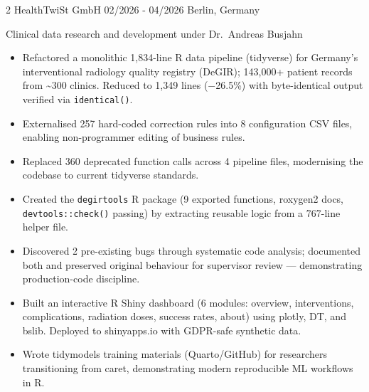 \documentclass{thejus_cv}
\begin{document}
\begin{paracol}{2}
             {HealthTwiSt GmbH}
             {02/2026 - 04/2026}
             {Berlin, Germany}
             {Clinical data research and development under Dr.~Andreas Busjahn
             \begin{itemize}\setlength{\itemsep}{0.05em}
                   \item Refactored a monolithic 1,834-line R data pipeline (tidyverse) for Germany's interventional radiology quality registry (DeGIR); 143,000+ patient records from \textasciitilde300 clinics. Reduced to 1,349 lines ($-$26.5\%) with byte-identical output verified via \texttt{identical()}.
                   \item Externalised 257 hard-coded correction rules into 8 configuration CSV files, enabling non-programmer editing of business rules.
                   \item Replaced 360 deprecated function calls across 4 pipeline files, modernising the codebase to current tidyverse standards.
                   \item Created the \texttt{degirtools} R package (9 exported functions, roxygen2 docs, \texttt{devtools::check()} passing) by extracting reusable logic from a 767-line helper file.
                   \item Discovered 2 pre-existing bugs through systematic code analysis; documented both and preserved original behaviour for supervisor review --- demonstrating production-code discipline.
                   \item Built an interactive R Shiny dashboard (6 modules: overview, interventions, complications, radiation doses, success rates, about) using plotly, DT, and bslib. Deployed to shinyapps.io with GDPR-safe synthetic data.
                   \item Wrote tidymodels training materials (Quarto/GitHub) for researchers transitioning from caret, demonstrating modern reproducible ML workflows in R.
               \end{itemize}}


\end{paracol}
\end{document}
